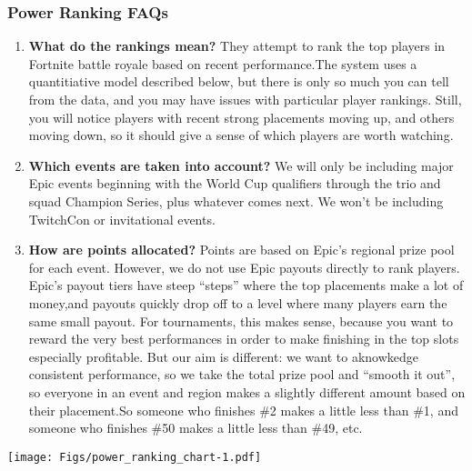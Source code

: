 \documentclass[]{article}
\title{}
\author{}
\date{}
\begin{document}
\hypertarget{power-ranking-faqs}{%
\subsubsection{Power Ranking FAQs}\label{power-ranking-faqs}}

\begin{enumerate}
\def\labelenumi{\arabic{enumi}.}
\item
  \textbf{What do the rankings mean?} They attempt to rank the top
  players in Fortnite battle royale based on recent performance.The
  system uses a quantitiative model described below, but there is only
  so much you can tell from the data, and you may have issues with
  particular player rankings. Still, you will notice players with recent
  strong placements moving up, and others moving down, so it should give
  a sense of which players are worth watching.
\item
  \textbf{Which events are taken into account?} We will only be
  including major Epic events beginning with the World Cup qualifiers
  through the trio and squad Champion Series, plus whatever comes next.
  We won't be including TwitchCon or invitational events.
\item
  \textbf{How are points allocated?} Points are based on Epic's regional
  prize pool for each event. However, we do not use Epic payouts
  directly to rank players. Epic's payout tiers have steep ``steps''
  where the top placements make a lot of money,and payouts quickly drop
  off to a level where many players earn the same small payout. For
  tournaments, this makes sense, because you want to reward the very
  best performances in order to make finishing in the top slots
  especially profitable. But our aim is different: we want to aknowkedge
  consistent performance, so we take the total prize pool and ``smooth
  it out'', so everyone in an event and region makes a slightly
  different amount based on their placement.So someone who finishes \#2
  makes a little less than \#1, and someone who finishes \#50 makes a
  little less than \#49, etc.
\end{enumerate}

\texttt{[image: Figs/power\_ranking\_chart-1.pdf]}
\end{document}
